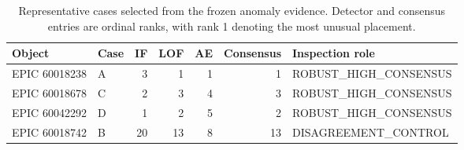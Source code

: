 \begin{table}
\caption{Representative cases selected from the frozen anomaly evidence. Detector and consensus entries are ordinal ranks, with rank 1 denoting the most unusual placement.}
\begin{tabular}{llrrrrl}
\hline
Object & Case & IF & LOF & AE & Consensus & Inspection role \\
\hline
EPIC 60018238 & A & 3 & 1 & 1 & 1 & ROBUST\_HIGH\_CONSENSUS \\
EPIC 60018678 & C & 2 & 3 & 4 & 3 & ROBUST\_HIGH\_CONSENSUS \\
EPIC 60042292 & D & 1 & 2 & 5 & 2 & ROBUST\_HIGH\_CONSENSUS \\
EPIC 60018742 & B & 20 & 13 & 8 & 13 & DISAGREEMENT\_CONTROL \\
\hline
\end{tabular}
\end{table}
